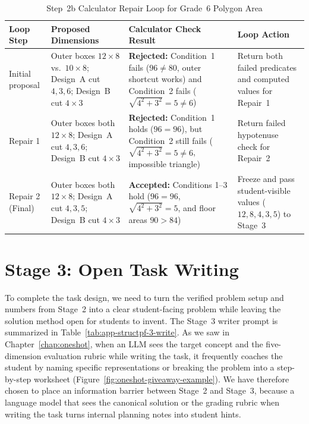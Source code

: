 \begin{table}[!htb]
\centering
\caption[Step 2b Calculator Repair Loop for Grade 6 Polygon Area]{Step~2b Calculator Repair Loop for Grade~6 Polygon Area}
\label{tab:d2b-number-regimes}
\footnotesize
\setlength{\tabcolsep}{4.5pt}
\renewcommand{\arraystretch}{1.18}
\begin{tabular}{@{} >{\raggedright\arraybackslash}p{} >{\raggedright\arraybackslash}p{} >{\raggedright\arraybackslash}p{} >{\raggedright\arraybackslash}p{} @{}}
\toprule
\textbf{Loop Step} & \textbf{Proposed Dimensions} & \textbf{Calculator Check Result} & \textbf{Loop Action} \\
\midrule
Initial proposal & Outer boxes $12 \times 8$ vs.\ $10 \times 8$; Design~A cut $4, 3, 6$; Design~B cut $4 \times 3$ & \textbf{Rejected:} Condition~1 fails ($96 \neq 80$, outer shortcut works) and Condition~2 fails ($\sqrt{4^2+3^2} = 5 \neq 6$) & Return both failed predicates and computed values for Repair~1 \\
Repair 1 & Outer boxes both $12 \times 8$; Design~A cut $4, 3, 6$; Design~B cut $4 \times 3$ & \textbf{Rejected:} Condition~1 holds ($96 = 96$), but Condition~2 still fails ($\sqrt{4^2+3^2} = 5 \neq 6$, impossible triangle) & Return failed hypotenuse check for Repair~2 \\
Repair 2 (Final) & Outer boxes both $12 \times 8$; Design~A cut $4, 3, 5$; Design~B cut $4 \times 3$ & \textbf{Accepted:} Conditions 1--3 hold ($96 = 96$, $\sqrt{4^2+3^2}=5$, and floor areas $90 > 84$) & Freeze and pass student-visible values ($12, 8, 4, 3, 5$) to Stage~3 \\
\bottomrule
\end{tabular}
\end{table}

\section{Stage 3: Open Task Writing}
\label{sec:structpf-d3}

To complete the task design, we need to turn the verified problem setup and numbers from Stage~2 into a clear student-facing problem while leaving the solution method open for students to invent. The Stage~3 writer prompt is summarized in Table~\ref{tab:app-structpf-3-write}. As we saw in Chapter~\ref{chap:oneshot}, when an LLM sees the target concept and the five-dimension evaluation rubric while writing the task, it frequently coaches the student by naming specific representations or breaking the problem into a step-by-step worksheet (Figure~\ref{fig:oneshot-giveaway-example}). We have therefore chosen to place an information barrier between Stage~2 and Stage~3, because a language model that sees the canonical solution or the grading rubric when writing the task turns internal planning notes into student hints.

